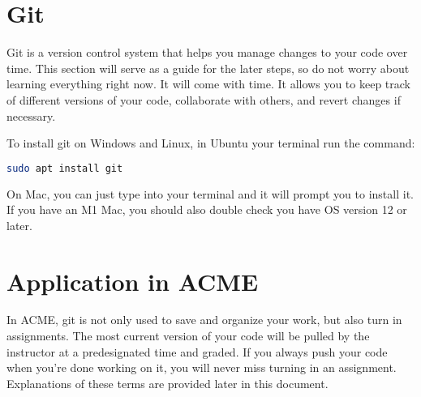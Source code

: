\begin{enumerate}


\end{enumerate}
\fi
\ifbootcamp
\section*{Git}

Git is a version control system that helps you manage changes to your code over time. 
This section will serve as a guide for the later steps, so do not worry about learning everything right now. 
It will come with time.
It allows you to keep track of different versions of your code, collaborate with others, and revert changes if necessary.

To install git on Windows and Linux, in 
\ifwindows
Ubuntu
\else
your terminal
\fi
run the command:
\begin{lstlisting}[language=bash]
sudo apt install git
\end{lstlisting}
\ifwindows

\else
On Mac, you can just type  into your terminal and it will prompt you to install it.
If you have an M1 Mac, you should also double check you have OS version 12 or later.
\fi

\section*{Application in ACME}

In ACME, git is not only used to save and organize your work, but also turn in assignments.
The most current version of your code will be pulled by the instructor at a predesignated time and graded.
If you always push your code when you're done working on it, you will never miss turning in an assignment.
Explanations of these terms are provided later in this document.
\fi
\ifwindows
